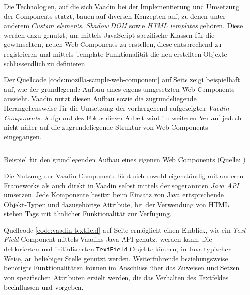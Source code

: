 \documentclass[a4paper,12pt,twoside]{scrreprt}
\begin{document}
Die Technologien, auf die sich Vaadin bei der Implementierung und Umsetzung der Components stützt, bauen auf diversen Konzepten auf, zu denen unter anderem \textit{Custom elements}, \textit{Shadow \ac{DOM}} sowie \textit{HTML templates} gehören. Diese werden dazu genutzt, um mittels JavaScript spezifische Klassen für die gewünschten, neuen Web Components zu erstellen, diese entsprechend zu registrieren und mittels Template-Funktionalität die neu erstellten Objekte schlussendlich zu definieren. \parencite[][]{mozilla_contributors_web_2021}

\medskip

Der Quellcode \ref{code:mozilla-sample-web-component} auf Seite \pageref{code:mozilla-sample-web-component} zeigt beispielhaft auf, wie der grundlegende Aufbau eines eigens umgesetzten Web Components aussieht. Vaadin nutzt diesen Aufbau sowie die zugrundeliegende Herangehensweise für die Umsetzung der vorhergehend aufgezeigten \textit{Vaadin Components}. \parencite[vgl.][]{vaadin_ltd_vaadin-text-fieldjs_2021} Aufgrund des Fokus dieser Arbeit wird im weiteren Verlauf jedoch nicht näher auf die zugrundeliegende Struktur von Web Components eingegangen.

\begin{listing}[ht]
    \inputminted[fontsize=\footnotesize,linenos]{js}{code/Mozilla_Web-Component-sample.js}
    \caption[Beispiel für den grundlegenden Aufbau eines eigenen Web Components]{Beispiel für den grundlegenden Aufbau eines eigenen Web Components (Quelle: \cite[][]{mozilla_contributors_using_2021})}
    \label{code:mozilla-sample-web-component}
\end{listing}

Die Nutzung der Vaadin Components lässt sich sowohl eigenständig mit anderen Frameworks als auch direkt in Vaadin selbst mittels der sogenannten \textit{Java API} umsetzen. Jede Komponente besitzt beim Einsatz von Java entsprechende Objekt-Typen und dazugehörige Attribute, bei der Verwendung von HTML stehen Tags mit ähnlicher Funktionalität zur Verfügung. \parencite[][]{vaadin_ltd_mobile_nodate}

\medskip

Quellcode \ref{code:vaadin-textfield} auf Seite \pageref{code:vaadin-textfield} ermöglicht einen Einblick, wie ein \textit{Text Field} Component mittels Vaadins Java API genutzt werden kann. Die deklarierten und initialisierten \texttt{TextField} Objekte können, in Java typischer Weise, an beliebiger Stelle genutzt werden. Weiterführende beziehungsweise benötigte Funktionalitäten können im Anschluss über das Zuweisen und Setzen von spezifischen Attributen erzielt werden, die das Verhalten des Textfeldes beeinflussen und vorgeben.
\end{document}
